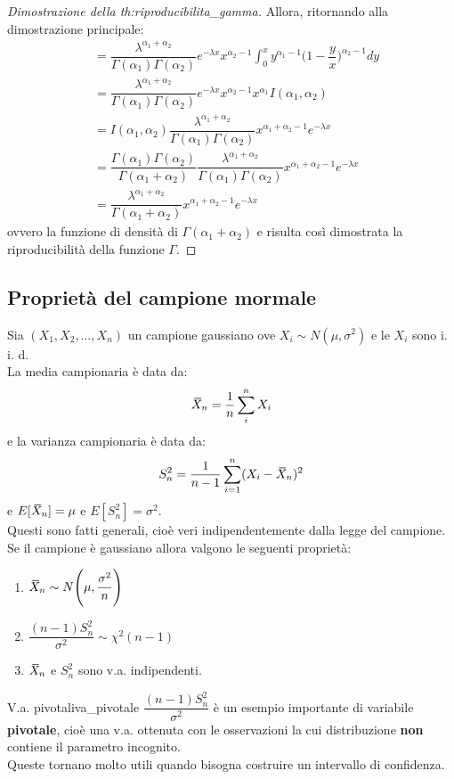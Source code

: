 \documentclass[12pt]{report}
\newcommand{\namerefl}[1]{%
	\bgroup
	\let\nmu\MakeLowercase
	\nameref{#1}\egroup}
\newcommand{\nmu}{}
\newcommand{\wbar}[1]{%
	\accentset{\mbox{\rule{0.55em}{0.5pt}}}{#1}%
}
\begin{document}
\begin{proof}[Dimostrazione della \namerefl{th:riproducibilita_gamma}]
		Allora, ritornando alla dimostrazione principale:
		\begin{align*}
			&= \dfrac{\lambda^{\alpha_1 + \alpha_2}}{\Gamma(\alpha_1)\Gamma(\alpha_2)}e^{-\lambda x}x^{\alpha_2 - 1}\int_{0}^{x}y^{\alpha_1 - 1}\bigg(1 - \dfrac{y}{x}\bigg)^{\alpha_2 - 1}dy \\
			&= \dfrac{\lambda^{\alpha_1 + \alpha_2}}{\Gamma(\alpha_1)\Gamma(\alpha_2)}e^{-\lambda x}x^{\alpha_2 - 1}x^{\alpha_1}I(\alpha_1, \alpha_2) \\
			&= I(\alpha_1, \alpha_2)\dfrac{\lambda^{\alpha_1 + \alpha_2}}{\Gamma(\alpha_1)\Gamma(\alpha_2)}x^{\alpha_1 + \alpha_2 - 1}e^{-\lambda x} \\
			&= \dfrac{\Gamma(\alpha_1)\Gamma(\alpha_2)}{\Gamma(\alpha_1 + \alpha_2)}\dfrac{\lambda^{\alpha_1 + \alpha_2}}{\Gamma(\alpha_1)\Gamma(\alpha_2)}x^{\alpha_1 + \alpha_2 - 1}e^{-\lambda x} \\
			&= \dfrac{\lambda^{\alpha_1 + \alpha_2}}{\Gamma(\alpha_1 + \alpha_2)}x^{\alpha_1 + \alpha_2 - 1}e^{-\lambda x}
		\end{align*}
		ovvero la funzione di densità di $\Gamma(\alpha_1 + \alpha_2)$ e risulta così dimostrata la riproducibilità della funzione $\Gamma$.
	\end{proof}
	\subsection{Proprietà del campione mormale}
	Sia $(X_1, X_2, \dots, X_n)$ un campione gaussiano ove $X_i \sim N(\mu, \sigma^2)$ e le $X_i$ sono i. i. d. \\
	La media campionaria è data da:
	\[
	\wbar{X}_n = \frac{1}{n}\sum_{i}^{n}X_i
	\]
	e la varianza campionaria è data da:
	\[
	S_n^2 = \frac{1}{n - 1}\sum_{i=1}^{n}(X_i - \wbar{X}_n)^2
	\]
	e $E[\wbar{X}_n] = \mu$ e $E[S_n^2] = \sigma^2$. \\
	Questi sono fatti generali, cioè veri indipendentemente dalla legge del campione. \\
	Se il campione è gaussiano allora valgono le seguenti proprietà:
	\begin{enumerate}
		\item $\wbar{X}_n \sim N\Bigg(\mu, \dfrac{\sigma^2}{n}\Bigg)$
		\item $\dfrac{(n-1)S_n^2}{\sigma^2} \sim \chi^2(n-1)$
		\item $\wbar{X}_n$ e $S_n^2$ sono v.a. indipendenti.
	\end{enumerate}
	\begin{note}{\nmu V.a. pivotali}{va_pivotale}
		$\dfrac{(n-1)S_n^2}{\sigma^2}$ è un esempio importante di variabile \textbf{pivotale}, cioè una v.a. ottenuta con le osservazioni la cui distribuzione \textbf{non} contiene il parametro incognito.\\
		Queste tornano molto utili quando bisogna costruire un intervallo di confidenza.
	\end{note}
\end{document}
